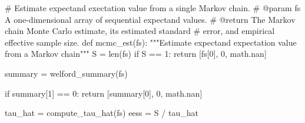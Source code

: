 \documentclass[
  letterpaper,
  DIV=11,
  numbers=noendperiod]{scrartcl}
\newenvironment{Shaded}{\begin{snugshade}}{\end{snugshade}}
\newcommand{\BuiltInTok}[1]{\textcolor[rgb]{0.00,0.23,0.31}{#1}}
\newcommand{\CommentTok}[1]{\textcolor[rgb]{0.37,0.37,0.37}{#1}}
\newcommand{\ControlFlowTok}[1]{\textcolor[rgb]{0.00,0.23,0.31}{#1}}
\newcommand{\DecValTok}[1]{\textcolor[rgb]{0.68,0.00,0.00}{#1}}
\newcommand{\KeywordTok}[1]{\textcolor[rgb]{0.00,0.23,0.31}{#1}}
\newcommand{\NormalTok}[1]{\textcolor[rgb]{0.00,0.23,0.31}{#1}}
\newcommand{\OperatorTok}[1]{\textcolor[rgb]{0.37,0.37,0.37}{#1}}
\begin{document}
\begin{Shaded}
\begin{Highlighting}[]

\CommentTok{\# Estimate expectand exectation value from a single Markov chain.}
\CommentTok{\# @param fs A one{-}dimensional array of sequential expectand values.}
\CommentTok{\# @return The Markov chain Monte Carlo estimate, its estimated standard }
\CommentTok{\#         error, and empirical effective sample size.}
\KeywordTok{def}\NormalTok{ mcmc\_est(fs):}
  \CommentTok{"""Estimate expectand expectation value from a Markov chain"""}
\NormalTok{  S }\OperatorTok{=} \BuiltInTok{len}\NormalTok{(fs)}
  \ControlFlowTok{if}\NormalTok{ S }\OperatorTok{==} \DecValTok{1}\NormalTok{:}
    \ControlFlowTok{return}\NormalTok{ [fs[}\DecValTok{0}\NormalTok{], }\DecValTok{0}\NormalTok{, math.nan]}
  
\NormalTok{  summary }\OperatorTok{=}\NormalTok{ welford\_summary(fs)}
  
  \ControlFlowTok{if}\NormalTok{ summary[}\DecValTok{1}\NormalTok{] }\OperatorTok{==} \DecValTok{0}\NormalTok{:}
    \ControlFlowTok{return}\NormalTok{ [summary[}\DecValTok{0}\NormalTok{], }\DecValTok{0}\NormalTok{, math.nan]}
  
\NormalTok{  tau\_hat }\OperatorTok{=}\NormalTok{ compute\_tau\_hat(fs)}
\NormalTok{  eess }\OperatorTok{=}\NormalTok{ S }\OperatorTok{/}\NormalTok{ tau\_hat}
\end{Highlighting}
\end{Shaded}
\end{document}
